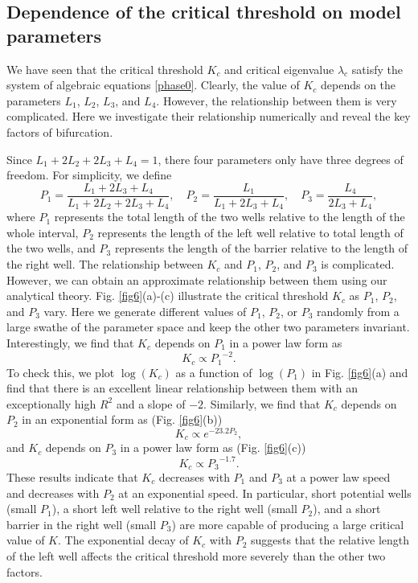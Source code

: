 \documentclass[a4paper,11pt]{article}
\begin{document}
\subsection{Dependence of the critical threshold on model parameters}
We have seen that the critical threshold $K_c$ and critical eigenvalue $\lambda_c$ satisfy the system of algebraic equations \eqref{phase0}. Clearly, the value of $K_c$ depends on the parameters $L_1$, $L_2$, $L_3$, and $L_4$. However, the relationship between them is very complicated. Here we investigate their relationship numerically and reveal the key factors of bifurcation.

Since $L_1 + 2 L_2 + 2 L_3 + L_4 = 1$, there four parameters only have three degrees of freedom. For simplicity, we define
\begin{equation}
P_1 = \frac{L_1 + 2 L_3 + L_4}{L_1 + 2 L_2 + 2 L_3 + L_4}, \quad P_2 = \frac{L_1}{L_1 + 2 L_3 + L_4}, \quad P_3 = \frac{L_4}{2 L_3 + L_4},
\end{equation}
where $P_1$ represents the total length of the two wells relative to the length of the whole interval, $P_2$ represents the length of the left well relative to total length of the two wells, and $P_3$ represents the length of the barrier relative to the length of the right well. The relationship between $K_c$ and $P_1$, $P_2$, and $P_3$ is complicated. However, we can obtain an approximate relationship between them using our analytical theory. Fig. \ref{fig6}(a)-(c) illustrate the critical threshold $K_c$ as $P_1$, $P_2$, and $P_3$ vary. Here we generate different values of $P_1$, $P_2$, or $P_3$ randomly from a large swathe of the parameter space and keep the other two parameters invariant. Interestingly, we find that $K_c$ depends on $P_1$ in a power law form as
\begin{equation}
K_c \propto {P_1}^{-2}.
\end{equation}
To check this, we plot $\log(K_c)$ as a function of $\log(P_1)$ in Fig. \ref{fig6}(a) and find that there is an excellent linear relationship between them with an exceptionally high $R^2$ and a slope of $-2$. Similarly, we find that $K_c$ depends on $P_2$ in an exponential form as (Fig. \ref{fig6}(b))
\begin{equation}
K_c \propto e^{-23.2P_2},
\end{equation}
and $K_c$ depends on $P_3$ in a power law form as (Fig. \ref{fig6}(c))
\begin{equation}
K_c \propto {P_3}^{-1.7}.
\end{equation}
These results indicate that $K_c$ decreases with $P_1$ and $P_3$ at a power law speed and decreases with $P_2$ at an exponential speed. In particular, short potential wells (small $P_1$), a short left well relative to the right well (small $P_2$), and a short barrier in the right well (small $P_3$) are more capable of producing a large critical value of $K$. The exponential decay of $K_c$ with $P_2$ suggests that the relative length of the left well affects the critical threshold more severely than the other two factors.
\end{document}

